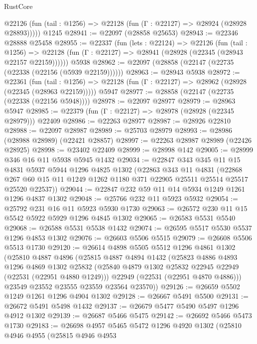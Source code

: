 \begin{lexlean}{RustCore}
\begin{coremodule}
      @22126 (fun (tail : @1256) => @22128 (fun (Γ : @22127) => @28924 (@28928 @28893)))))
    @1245
@28941 := @22097 (@28858 @25653)
@28943 := @22346 @28888 @25458
@28955 := @22337
    (fun (lets : @22124) =>
    @22126
      (fun (tail : @1256) =>
      @22128 (fun (Γ : @22127) => @28941 (@28928 (@22345 (@28943 @22157 @22159))))))
    @5938
@28962 := @22097 (@28858 (@22147 (@22735 (@22338 (@22156 (@5939 @22159))))))
@28963 := @28943 @5938
@28972 := @22361
    (fun (tail : @1256) => @22128 (fun (Γ : @22127) => @28962 (@28928 (@22345 (@28963 @22159)))))
    @5947
@28977 := @28858 (@22147 (@22735 (@22338 (@22156 @5948))))
@28978 := @22097 @28977
@28979 := @28963 @5947
@28985 := @22379 (fun (Γ : @22127) => @28978 (@28928 (@22345 @28979))) @22409
@28986 := @22263 @28977
@28987 := @28926 @22810
@28988 := @22097 @28987
@28989 := @25703 @28979
@28993 := @28986 (@28988 @28989) (@22421 @28857)
@28997 := @22263 @28987 @28989 (@22426 @28925)
@28998 := @23402 @22409
@28999 := @28998 @142
@29005 := @28999 @346 @16 @11 @5938 @5945 @1432
@29034 := @22847
    @343
    @345
    @11
    @15
    @4831
    @5937
    @5944
    @1296
    @4825
    @1302
    (@22863
      @343
      @11
      @4831
      (@22868 @267 @60 @15 @11 @1249 @1262 @1180 @371 @22905 @25511 @25514 @25517 @25520 @22537))
@29044 := @22847 @232 @59 @11 @14 @5934 @1249 @1261 @1296 @4837 @1302
@29048 := @25766 @232 @11 @5923 @5932
@29054 := @25792 @231 @16 @11 @5923 @5930 @1730
@29063 := @26572 @230 @11 @15 @5542 @5922 @5929 @1296 @4845 @1302
@29065 := @26583 @5531 @5540
@29068 := @26588 @5531 @5538 @1432
@29074 := @26595 @5517 @5530 @5537 @1296 @4853 @1302
@29076 := @26603 @5506 @5515
@29079 := @26608 @5506 @5513 @1730
@29120 := @26614
    @4898
    @5505
    @5512
    @1296
    @4861
    @1302
    (@25810
      @4887
      @4896
      (@25815
        @4887
        @4894
        @1432
        (@25823
          @4886
          @4893
          @1296
          @4869
          @1302
          @25832
          (@25840 @4879 @1302 @25832 @22945 @22949 (@22531 (@22951 @4880 @1249)))
          @22949
          (@22531 (@22951 @4870 @4886)))
        @23549
        @23552
        @23555
        @23559
        @23564
        @23570))
@29126 := @26659 @5502 @1249 @1261 @1296 @4904 @1302
@29128 := @26667 @5491 @5500
@29131 := @26672 @5491 @5498 @1432
@29137 := @26679 @5477 @5490 @5497 @1296 @4912 @1302
@29139 := @26687 @5466 @5475
@29142 := @26692 @5466 @5473 @1730
@29183 := @26698
    @4957
    @5465
    @5472
    @1296
    @4920
    @1302
    (@25810
      @4946
      @4955
      (@25815
        @4946
        @4953

\end{coremodule}
\end{lexlean}
